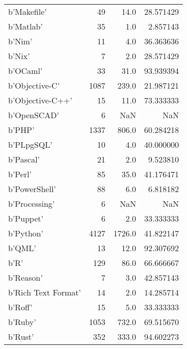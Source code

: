 \begin{table}
\begin{tabular}{|l|r|r|r|}
b'Makefile'         &                    49 &      14.0 &      28.571429 \\
b'Matlab'           &                    35 &       1.0 &       2.857143 \\
b'Nim'              &                    11 &       4.0 &      36.363636 \\
b'Nix'              &                     7 &       2.0 &      28.571429 \\
b'OCaml'            &                    33 &      31.0 &      93.939394 \\
b'Objective-C'      &                  1087 &     239.0 &      21.987121 \\
b'Objective-C++'    &                    15 &      11.0 &      73.333333 \\
b'OpenSCAD'         &                     6 &       NaN &            NaN \\
b'PHP'              &                  1337 &     806.0 &      60.284218 \\
b'PLpgSQL'          &                    10 &       4.0 &      40.000000 \\
b'Pascal'           &                    21 &       2.0 &       9.523810 \\
b'Perl'             &                    85 &      35.0 &      41.176471 \\
b'PowerShell'       &                    88 &       6.0 &       6.818182 \\
b'Processing'       &                     6 &       NaN &            NaN \\
b'Puppet'           &                     6 &       2.0 &      33.333333 \\
b'Python'           &                  4127 &    1726.0 &      41.822147 \\
b'QML'              &                    13 &      12.0 &      92.307692 \\
b'R'                &                   129 &      86.0 &      66.666667 \\
b'Reason'           &                     7 &       3.0 &      42.857143 \\
b'Rich Text Format' &                    14 &       2.0 &      14.285714 \\
b'Roff'             &                    15 &       5.0 &      33.333333 \\
b'Ruby'             &                  1053 &     732.0 &      69.515670 \\
b'Rust'             &                   352 &     333.0 &      94.602273 \\

\end{tabular}
\end{table}
